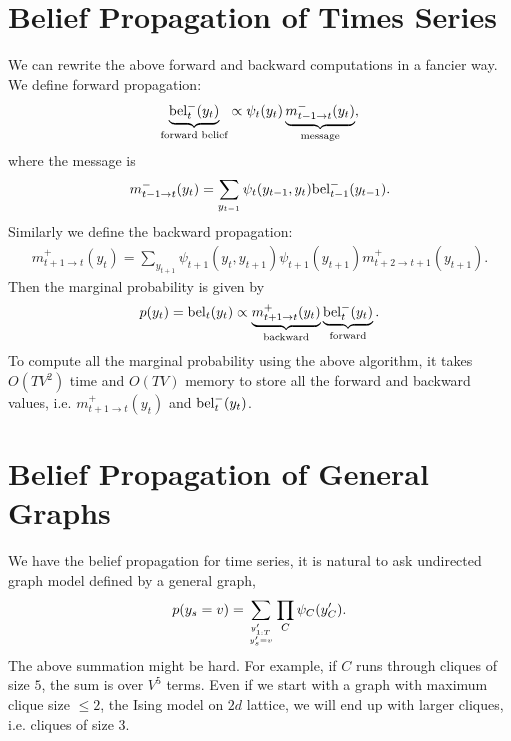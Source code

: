 \documentclass{article}
\begin{document}
\section{Belief Propagation of Times Series}
We can rewrite the above forward and backward computations in a fancier way. We define forward propagation:
\begin{align*}
\underbrace{{\rm bel}_t^-(y_t)}_{\text{forward belief}}
\propto \psi_t(y_t)
\underbrace{m_{t-1\rightarrow t}^-(y_t)}_{\text{message}},
\end{align*}
where the message is 
\begin{align*}
m_{t-1\rightarrow t}^-(y_t)=\sum_{y_{t-1}}\psi_t(y_{t-1},y_t){\rm bel}_{t-1}^-(y_{t-1}).
\end{align*}
Similarly we define the backward propagation:
\begin{align*}
m_{t+1\rightarrow t}^+(y_t)=\sum_{y_{t+1}}\psi_{t+1}(y_t,y_{t+1})\psi_{t+1}(y_{t+1})m_{t+2\rightarrow t+1}^+(y_{t+1}).
\end{align*}
Then the marginal probability is given by 
\begin{align*}
p(y_t)={\rm bel}_t(y_t)\propto \underbrace{m_{t+1\rightarrow t}^+(y_t)}_{\text{backward}}\underbrace{{\rm bel}_t^{-}(y_t)}_{\text{forward}}.
\end{align*}
To compute all the marginal probability using the above algorithm, it takes $O(TV^2)$ time and $O(TV)$ memory to store all the forward and backward values, i.e. $m_{t+1\rightarrow t}^+(y_t)$ and ${\rm bel}_t^{-}(y_t)$.

\section{Belief Propagation of General Graphs}
We have the belief propagation for time series, it is natural to ask undirected graph model defined by a general graph, 
\begin{align*}
p(y_s=v)=\sum_{y'_{1:T}\atop y_s'=v}\prod_C\psi_C(y_C').
\end{align*}
The above summation might be hard. For example, if $C$ runs through cliques of size $5$, the sum is over $V^5$ terms. Even if we start with a graph with maximum clique size $\leq 2$, the Ising model on $2d$ lattice, we will end up with larger cliques, i.e. cliques of size $3$.
\end{document}

